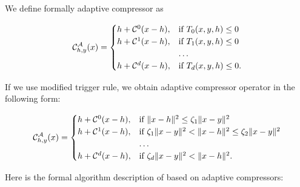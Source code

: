 \documentclass[nohyperref]{article}
\theoremstyle{plain}
\theoremstyle{definition}
\theoremstyle{remark}
\begin{document}
We define formally adaptive  compressor as

\begin{eqnarray}\label{eq:ad_compressor}
\mathcal{C}^{\mathcal{A}}_{h,y}(x) = 
\begin{cases}
h + \mathcal{C}^0(x - h),& \text{if } T_0(x,y,h) \leq 0\\
h + \mathcal{C}^1(x - h),& \text{if } T_1(x,y,h) \leq 0\\
& \ldots\\
h + \mathcal{C}^d(x - h),& \text{if } T_d(x,y,h) \leq 0.
\end{cases}
\end{eqnarray} 

If we use modified  trigger rule, we obtain adaptive compressor operator in the following form:

\begin{eqnarray}\label{eq:ad_compressor2}
\mathcal{C}^{\mathcal{A}}_{h,y}(x) = 
\begin{cases}
h + \mathcal{C}^0(x - h),& \text{if } \|x- h\|^2 \leq \zeta_1 \|x - y\|^2\\
h + \mathcal{C}^1(x - h),& \text{if } \zeta_1 \|x - y\|^2 < \|x- h\|^2 \leq \zeta_2 \|x - y\|^2\\
& \ldots\\
h + \mathcal{C}^d(x - h),& \text{if } \zeta_{d} \|x - y\|^2 < \|x- h\|^2.
\end{cases}
\end{eqnarray} 

Here is the formal algorithm description of  based on adaptive  compressors:
\end{document}
